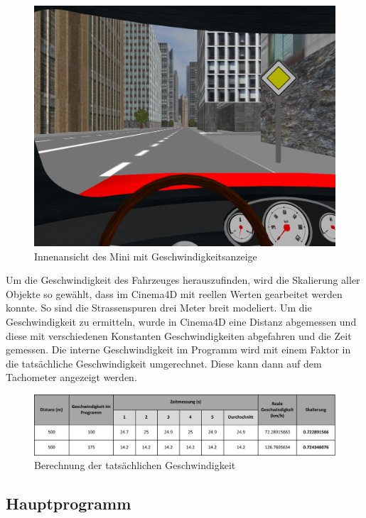 \begin{figure}[H]
\centering 
\includegraphics[width=1\linewidth]{src/screenshot_cockpit.png}
\caption{Innenansicht des Mini mit Geschwindigkeitsanzeige} %
\label{screenshot_cockpit} %
\end{figure}
Um die Geschwindigkeit des Fahrzeuges herauszufinden, wird die Skalierung aller Objekte so gewählt, dass im Cinema4D mit reellen Werten gearbeitet werden konnte. So sind die Strassenspuren drei Meter breit modeliert. Um die Geschwindigkeit zu ermitteln, wurde in Cinema4D eine Distanz abgemessen und diese mit verschiedenen Konstanten Geschwindigkeiten abgefahren und die Zeit gemessen. Die interne Geschwindigkeit im Programm wird mit einem Faktor in die tatsächliche Geschwindigkeit umgerechnet. Diese kann dann auf dem Tachometer angezeigt werden.\\
\begin{figure}[H]
\centering 
\includegraphics[width=1\linewidth]{src/geschwindigkeitsberechnung.pdf}
\caption{Berechnung der tatsächlichen Geschwindigkeit} %
\label{berechnung_geschwindigkeit} %
\end{figure}

\newpage
\subsection{Hauptprogramm}

